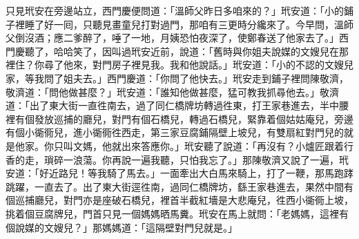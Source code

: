 只見玳安在旁邊站立，西門慶便問道：「溫師父昨日多咱來的？」玳安道：「小的鋪子裡睡了好一囘，只聽見畫童兒打對過門，那咱有三更時分纔來了。今早問，溫師父倒沒酒；應二爹醉了，唾了一地，月姨恐怕夜深了，使鄭春送了他家去了。」西門慶聽了，哈哈笑了，因叫過玳安近前，說道：「舊時與你姐夫說媒的文嫂兒在那裡住？你尋了他來，對門房子裡見我。我和他說話。」玳安道：「小的不認的文嫂兒家，等我問了姐夫去。」西門慶道：「你問了他快去。」玳安走到鋪子裡問陳敬濟，敬濟道：「問他做甚麼？」玳安道：「誰知他做甚麼，猛可教我抓尋他去。」{}敬濟道：「出了東大街一直徃南去，過了同仁橋牌坊轉過徃東，打王家巷進去，半中腰裡有個發放巡捕的廳兒，對門有個石橋兒，轉過石橋兒，緊靠着個姑姑庵兒，旁邊有個小衚衕兒，進小衚衕徃西走，第三家豆腐鋪隔壁上坡兒，有雙扇紅對門兒的就是他家。你只叫文媽，他就出來答應你。」玳安聽了說道：「再沒有？小爐匠跟着行香的走，瑣碎一浪蕩。你再說一遍我聽，{}只怕我忘了。」那陳敬濟又說了一遍，玳安道：「好近路兒！等我騎了馬去。」一面牽出大白馬來騎上，打了一鞭，那馬跑踍跳躍，一直去了。出了東大街逕徃南，過同仁橋牌坊，繇王家巷進去，果然中間有個巡捕廳兒，對門亦是座破石橋兒，裡首半截紅墻是大悲庵兒，徃西小衚衕上坡，挑着個豆腐牌兒，門首只見一個媽媽晒馬糞。玳安在馬上就問：「老媽媽，這裡有個說媒的文嫂兒？」那媽媽道：「這隔壁對門兒就是。」

